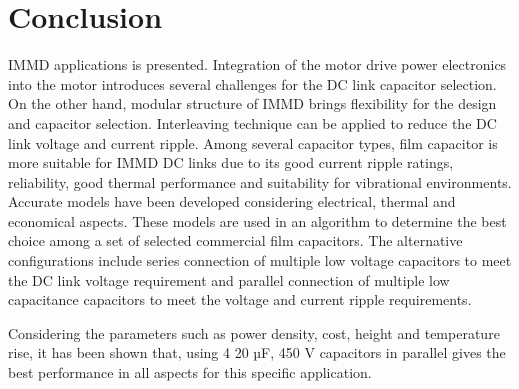 \documentclass[conference,a4paper,twocolumn]{IEEEtran}
\begin{document}
\section{Conclusion}

IMMD applications is presented. Integration of the motor drive power electronics into the motor introduces several challenges for the DC link capacitor selection. On the other hand, modular structure of IMMD brings flexibility for the design and capacitor selection. Interleaving technique can be applied to reduce the DC link voltage and current ripple. Among several capacitor types, film capacitor is more suitable for IMMD DC links due to its good current ripple ratings, reliability, good thermal performance and suitability for vibrational environments. Accurate models have been developed considering electrical, thermal and economical aspects. These models are used in an algorithm to determine the best choice among a set of selected commercial film capacitors. The alternative configurations include series connection of multiple low voltage capacitors to meet the DC link voltage requirement and parallel connection of multiple low capacitance capacitors to meet the voltage and current ripple requirements.

Considering the parameters such as power density, cost, height and temperature rise, it has been shown that, using 4 20 µF, 450 V capacitors in parallel gives the best performance in all aspects for this specific application.




\end{document}
